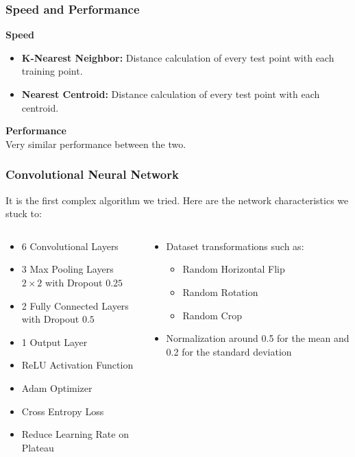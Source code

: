 \begin{frame}
\frametitle{Speed and Performance}
\center \textbf{Speed}
\begin{itemize}
    \item \textbf{K-Nearest Neighbor:} Distance calculation of every test point with each training point.
    \item \textbf{Nearest Centroid:} Distance calculation of every test point with each centroid.
\end{itemize}
\center \textbf{Performance}\\
Very similar performance between the two.
\end{frame}

\begin{frame}
\frametitle{Convolutional Neural Network}
It is the first complex algorithm we tried. Here are the network characteristics we stuck to:
\begin{columns}
    \begin{column}{0.5\textwidth}
        \begin{itemize}
            \item 6 Convolutional Layers
            \item 3 Max Pooling Layers $2 \times 2$ with Dropout $0.25$
            \item 2 Fully Connected Layers with Dropout $0.5$
            \item 1 Output Layer
            \item ReLU Activation Function
            \item Adam Optimizer
            \item Cross Entropy Loss
            \item Reduce Learning Rate on Plateau
        \end{itemize}
    \end{column}
    \begin{column}{0.5\textwidth}
        \begin{itemize}
            \item Dataset transformations such as:
            \begin{itemize}
                \item Random Horizontal Flip
                \item Random Rotation
                \item Random Crop    
            \end{itemize}
            \item Normalization around 0.5 for the mean and 0.2 for the standard deviation
        \end{itemize}
    \end{column}
\end{columns}
\end{frame}

